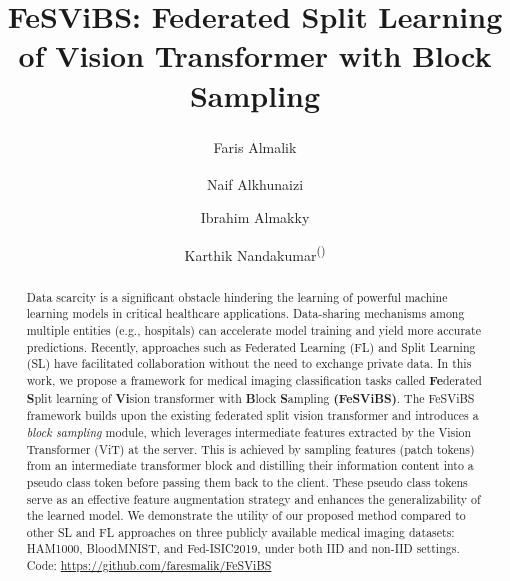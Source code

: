 \documentclass[runningheads]{llncs}
\begin{document}
%
\title{FeSViBS: Federated Split Learning of Vision Transformer with Block Sampling}
%
%
\author{Faris Almalik\textsuperscript{\dag} \and Naif Alkhunaizi\textsuperscript{\dag} \and Ibrahim Almakky \and Karthik Nandakumar\textsuperscript{(\faEnvelopeO)}}


\maketitle              %
%
\begin{abstract}
Data scarcity is a significant obstacle hindering the learning of powerful machine learning models in critical healthcare applications. Data-sharing mechanisms among multiple entities (e.g., hospitals) can accelerate model training and yield more accurate predictions. Recently, approaches such as Federated Learning (FL) and Split Learning (SL) have facilitated collaboration without the need to exchange private data. In this work, we propose a framework for medical imaging classification tasks called \textbf{Fe}derated \textbf{S}plit learning of \textbf{Vi}sion transformer with \textbf{B}lock \textbf{S}ampling \textbf{(FeSViBS)}. The FeSViBS framework builds upon the existing federated split vision transformer and introduces a \emph{block sampling} module, which leverages intermediate features extracted by the Vision Transformer (ViT) at the server. This is achieved by sampling features (patch tokens) from an intermediate transformer block and distilling their information content into a pseudo class token before passing them back to the client. These pseudo class tokens serve as an effective feature augmentation strategy and enhances the generalizability of the learned model. We demonstrate the utility of our proposed method compared to other SL and FL approaches on three publicly available medical imaging datasets: HAM1000, BloodMNIST, and Fed-ISIC2019, under both IID and non-IID settings. Code: \url{https://github.com/faresmalik/FeSViBS} 

\end{abstract}
\end{document}
